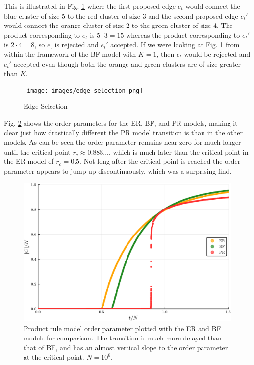 This is illustrated in Fig. \ref{fig:edge_selection} where the first proposed edge $e_t$ would connect the blue cluster of size 5 to the red cluster of size 3 and the second proposed edge $e_t'$ would connect the orange cluster of size 2 to the green cluster of size 4.
The product corresponding to $e_t$ is $5 \cdot 3 = 15$ whereas the product corresponding to $e_t'$ is $2 \cdot 4 = 8$, so $e_t$ is rejected and $e_t'$ accepted.
If we were looking at Fig. \ref{fig:edge_selection} from within the framework of the BF model with $K = 1$, then $e_t$ would be rejected and $e_t'$ accepted even though both the orange and green clusters are of size greater than $K$.

\begin{figure}[H]
	\centering
	\texttt{[image: images/edge\_selection.png]}
	\caption{Edge Selection}
	\label{fig:edge_selection}
\end{figure}

Fig. \ref{fig:ER_BF_PR_transition} shows the order parameters for the ER, BF, and PR models, making it clear just how drastically different the PR model transition is than in the other models.
As can be seen the order parameter remains near zero for much longer until the critical point $r_c \approx 0.888...$, which is much later than the critical point in the ER model of $r_c = 0.5$.
Not long after the critical point is reached the order parameter appears to jump up discontinuously, which was a surprising find.

\begin{figure}[H]
	\centering
	\includegraphics[width=350pt]{images/Network_ER_BF_PR_1e6_order_param.png}
	\caption{Product rule model order parameter plotted with the ER and BF models for comparison. The transition is much more delayed than that of BF, and has an almost vertical slope to the order parameter at the critical point. $N = 10^6$.}
	\label{fig:ER_BF_PR_transition}
\end{figure}

